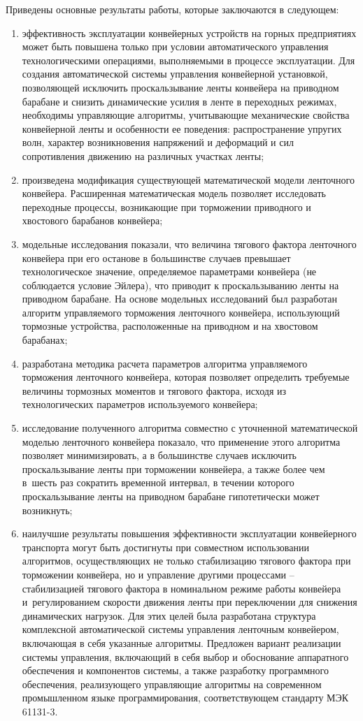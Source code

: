 Приведены основные результаты работы, которые заключаются в следующем:
\begin{enumerate}
	\item эффективность эксплуатации конвейерных устройств на горных предприятиях может быть повышена только при условии автоматического управления технологическими операциями, выполняемыми в процессе эксплуатации. Для создания автоматической системы управления конвейерной установкой, позволяющей исключить проскальзывание ленты конвейера на приводном барабане и снизить динамические усилия в ленте в переходных режимах, необходимы управляющие алгоритмы, учитывающие механические свойства  конвейерной ленты и особенности ее поведения: распространение упругих волн, характер возникновения напряжений и деформаций и сил сопротивления движению на различных участках ленты;
	\item произведена модификация существующей математической модели ленточного конвейера. Расширенная математическая модель позволяет исследовать переходные процессы, возникающие при торможении приводного и хвостового барабанов конвейера;
	\item модельные исследования показали, что величина тягового фактора ленточного конвейера при его останове в большинстве случаев превышает технологическое значение, определяемое параметрами конвейера (не соблюдается условие Эйлера), что приводит к проскальзыванию ленты на приводном барабане. На основе модельных исследований был разработан алгоритм управляемого торможения ленточного конвейера, использующий тормозные устройства, расположенные на приводном и на хвостовом барабанах;
	\item разработана методика расчета параметров алгоритма управляемого торможения ленточного конвейера, которая позволяет определить требуемые величины тормозных моментов и тягового фактора, исходя из технологических параметров используемого конвейера;
	\item исследование полученного алгоритма совместно с уточненной математической моделью ленточного конвейера показало, что применение этого алгоритма позволяет минимизировать, а в большинстве случаев исключить проскальзывание ленты при торможении конвейера, а также более чем в~шесть раз сократить временной интервал, в течении которого проскальзывание ленты на приводном барабане гипотетически может возникнуть;
	\item наилучшие результаты повышения эффективности эксплуатации конвейерного транспорта могут быть достигнуты при совместном использовании алгоритмов, осуществляющих не только стабилизацию тягового фактора при торможении конвейера, но и управление другими процессами -- стабилизацией тягового фактора в номинальном режиме работы конвейера и~регулированием скорости движения ленты при переключении для снижения динамических нагрузок. Для этих целей была разработана структура комплексной автоматической системы управления ленточным конвейером, включающая в себя указанные алгоритмы. Предложен вариант реализации системы управления, включающий в себя выбор и обоснование аппаратного обеспечения и компонентов системы, а также разработку программного обеспечения, реализующего управляющие алгоритмы на современном промышленном языке программирования, соответствующем стандарту МЭК 61131-3.
\end{enumerate}

\renewcommand{\refname}{\Large Публикации автора по теме диссертации}
\nocite{*}
